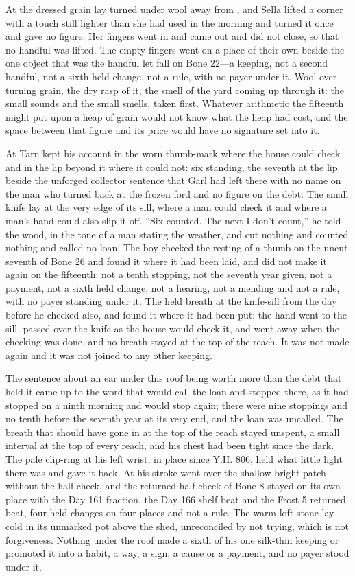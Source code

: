 At  the dressed grain lay turned under wool away from , and Sella lifted a corner with a touch still lighter than she had used in the morning and turned it once and gave no figure. Her fingers went in and came out and did not close, so that no handful was lifted. The empty fingers went on a place of their own beside the one object that was the handful let fall on Bone 22---a keeping, not a second handful, not a sixth held change, not a rule, with no payer under it. Wool over turning grain, the dry rasp of it, the smell of the yard coming up through it: the small sounds and the small smells, taken first. Whatever arithmetic the fifteenth might put upon a heap of grain would not know what the heap had cost, and the space between that figure and its price would have no signature set into it.

At  Tarn kept his account in the worn thumb-mark where the house could check and in the lip beyond it where it could not: six standing, the seventh at the lip beside the unforged collector sentence that Garl had left there with no name on the man who turned back at the frozen ford and no figure on the debt. The small knife lay at the very edge of its sill, where a man could check it and where a man's hand could also slip it off. “Six counted. The next I don't count,” he told the wood, in the tone of a man stating the weather, and cut nothing and counted nothing and called no loan. The boy checked the resting of a thumb on the uncut seventh of Bone 26 and found it where it had been laid, and did not make it again on the fifteenth: not a tenth stopping, not the seventh year given, not a payment, not a sixth held change, not a hearing, not a mending and not a rule, with no payer standing under it. The held breath at the knife-sill from the day before he checked also, and found it where it had been put; the hand went to the sill, passed over the knife as the house would check it, and went away when the checking was done, and no breath stayed at the top of the reach. It was not made again and it was not joined to any other keeping.

The sentence about an ear under this roof being worth more than the debt that held it came up to the word that would call the loan and stopped there, as it had stopped on a ninth morning and would stop again; there were nine stoppings and no tenth before the seventh year at its very end, and the loan was uncalled. The breath that should have gone in at the top of the reach stayed unspent, a small interval at the top of every reach, and his chest had been tight since the dark. The pale clip-ring at his left wrist, in place since Y.H. 806, held what little light there was and gave it back. At  his stroke went over the shallow bright patch without the half-check, and the returned half-check of Bone 8 stayed on its own place with the Day 161 fraction, the Day 166 shelf beat and the Frost 5 returned beat, four held changes on four places and not a rule. The warm loft stone lay cold in its unmarked pot above the shed, unreconciled by not trying, which is not forgiveness. Nothing under the roof made a sixth of his one silk-thin keeping or promoted it into a habit, a way, a sign, a cause or a payment, and no payer stood under it.

